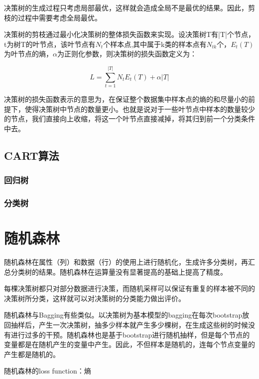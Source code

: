 	决策树的生成过程只考虑局部最优，这样就会造成全局不是最优的结果。因此，剪枝的过程中需要考虑全局最优。
	
	决策树的剪枝通过最小化决策树的整体损失函数来实现。设决策树T有|T|个节点，t为树T的叶节点，该叶节点有$N_t$个样本点,其中属于k类的样本点有$N_{tk}$个，$E_t(T)$为叶节点的熵，$\alpha$为正则化参数，则决策树的损失函数定义为：
	
	\begin{equation}
	L = \sum _{t=1} ^{|T|}N_t E_t(T) + \alpha |T|
	\end{equation}
	
	决策树的损失函数表示的意思为，在保证整个数据集中样本点的熵的和尽量小的前提下，使得决策树中节点的数量更小。也就是说对于一些叶节点中样本的数量较少的节点，我们直接向上收缩，将这一个叶节点直接减掉，将其归到前一个分类条件中去。
	
	\subsection{CART算法}
	\subsubsection{回归树}
	\subsubsection{分类树}
	
\section{随机森林}
	随机森林在属性（列）和数据（行）的使用上进行随机化，生成许多分类树，再汇总分类树的结果。随机森林在运算量没有显著提高的基础上提高了精度。
	
	每棵决策树都只对部分数据进行决策，而随机采样可以保证有重复的样本被不同的决策树所分类，这样就可以对决策树的分类能力做出评价。
	
	随机森林与Bagging有些类似。以决策树为基本模型的bagging在每次bootstrap放回抽样后，产生一次决策树，抽多少样本就产生多少棵树，在生成这些树的时候没有进行过多的干预。随机森林也是基于bootstrap进行随机抽样，但是每个节点的变量都是在随机产生的变量中产生。因此，不但样本是随机的，连每个节点变量的产生都是随机的。
	
	随机森林的loss function：熵
	
